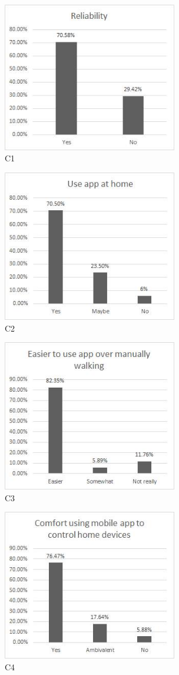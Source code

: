 \documentclass[journal]{IEEEtran}
\begin{document}
\begin{figure}[!t]
\centering
\includegraphics[width=3in]{R1.jpg}
\caption{C1}
\label{fig2}
\end{figure}
\begin{figure}[!t]
\centering
\includegraphics[width=3in]{R2.jpg}
\caption{C2}
\label{fig2}
\end{figure}
\begin{figure}[!t]
\centering
\includegraphics[width=3in]{R3.jpg}
\caption{C3}
\label{fig2}
\end{figure}
\begin{figure}[!t]
\centering
\includegraphics[width=3in]{R4.jpg}
\caption{C4}
\label{fig2}
\end{figure}
\end{document}
